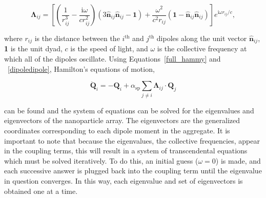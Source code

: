 \documentclass[12pt, letterpaper, twoside]{report}
\begin{document}
\begin{equation}
\boldsymbol{\Lambda}_{ij} = \left[\left(\frac{1}{r_{ij}^3} - \frac{\textrm{i}\omega}{cr_{ij}^2}\right)\left(3\hat{\textbf{n}}_{ij}\hat{\textbf{n}}_{ij} - \textbf{1}\right) + \frac{\omega^2}{c^2r_{ij}}\left(\textbf{1} - \hat{\textbf{n}}_{ij}\hat{\textbf{n}}_{ij}\right)\right]e^{\textrm{i}\omega r_{ij}/c},
\label{dipoledipole}
\end{equation}

\noindent where $r_{ij}$ is the distance between the $i^{\textrm{th}}$ and $j^{\textrm{th}}$ dipoles along the unit vector $\hat{\textbf{n}}_{ij}$, \textbf{1} is the unit dyad, $c$ is the speed of light, and $\omega$ is the collective frequency at which all of the dipoles oscillate. Using Equations~\ref{full_hammy} and ~\ref{dipoledipole}, Hamilton's equations of motion,

\begin{equation}
\ddot{\textbf{Q}}_{i} = -\textbf{Q}_{i} + \alpha_{\textrm{sp}}\sum_{j\neq i}\boldsymbol{\Lambda}_{ij}\cdot\textbf{Q}_{j}
\label{eom}
\end{equation}

\noindent can be found and the system of equations can be solved for the eigenvalues and eigenvectors of the nanoparticle array. The eigenvectors are the generalized coordinates corresponding to each dipole moment in the aggregate. It is important to note that because the eigenvalues, the collective frequencies, appear in the coupling terms, this will result in a system of transcendental equations which must be solved iteratively. To do this, an initial guess ($\omega = 0$) is made, and each successive answer is plugged back into the coupling term until the eigenvalue in question converges. In this way, each eigenvalue and set of eigenvectors is obtained one at a time.
\end{document}
